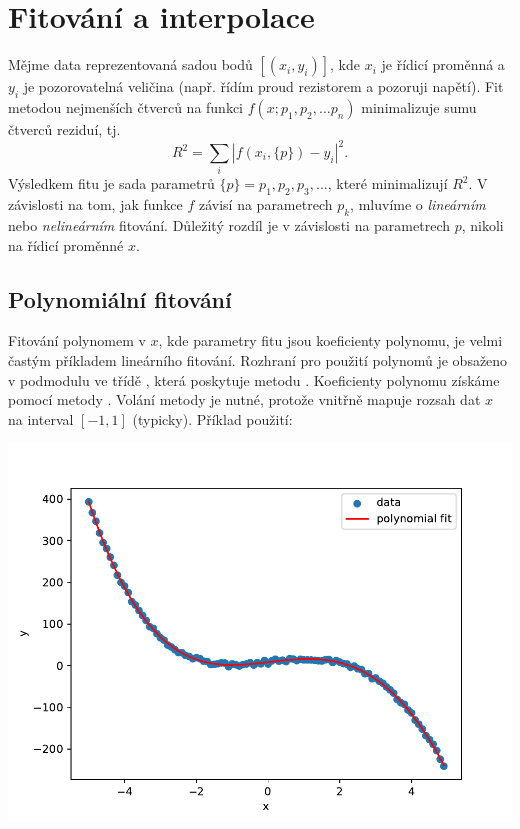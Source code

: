 \newpage
\section{Fitování a interpolace}
Mějme data reprezentovaná sadou bodů $[(x_i, y_i)]$, kde $x_i$ je řídicí proměnná a $y_i$ je pozorovatelná veličina (např. řídím proud rezistorem a pozoruji napětí). Fit metodou nejmenších čtverců na funkci $f(x; p_1, p_2, ... p_n)$ minimalizuje sumu čtverců reziduí, tj.
\begin{equation}
    R^2 = \sum_i \left|f(x_i, \{p\}) - y_i\right|^2.
\end{equation}
Výsledkem fitu je sada parametrů $\{p\} = p_1, p_2, p_3, ...$, které minimalizují $R^2$. V závislosti na tom, jak funkce $f$ závisí na parametrech $p_k$, mluvíme o \emph{lineárním} nebo \emph{nelineárním} fitování. Důležitý rozdíl je v závislosti na parametrech $p$, nikoli na řídicí proměnné $x$.


\subsection{Polynomiální fitování}
Fitování polynomem v $x$, kde parametry fitu jsou koeficienty polynomu, je velmi častým příkladem lineárního fitování. Rozhraní pro použití polynomů je obsaženo v podmodulu  ve třídě , která poskytuje metodu . Koeficienty polynomu získáme pomocí metody . Volání metody  je nutné, protože  vnitřně mapuje rozsah dat $x$ na interval $[-1, 1]$ (typicky). Příklad použití:


\begin{center}
    \includegraphics[width=0.5\linewidth]{polynomial_fit.pdf}
\end{center}

